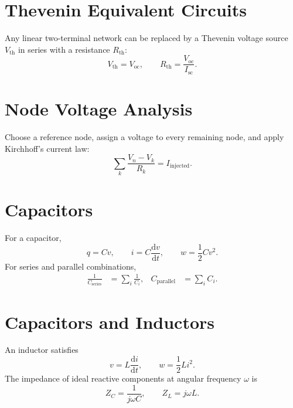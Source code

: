 \documentclass[12pt,a4paper]{article}
\begin{document}
\section{Thevenin Equivalent Circuits}

Any linear two-terminal network can be replaced by a Thevenin voltage
source $V_{\mathrm{th}}$ in series with a resistance $R_{\mathrm{th}}$:
\begin{equation}
	V_{\mathrm{th}} = V_{\mathrm{oc}},\qquad
	R_{\mathrm{th}} = \frac{V_{\mathrm{oc}}}{I_{\mathrm{sc}}}.
\end{equation}

\section{Node Voltage Analysis}

Choose a reference node, assign a voltage to every remaining node, and
apply Kirchhoff's current law:
\begin{equation}
	\sum_k \frac{V_n - V_k}{R_k} = I_{\mathrm{injected}}.
\end{equation}

\section{Capacitors}

For a capacitor,
\begin{equation}
	q = Cv,\qquad i = C\frac{\mathrm{d}v}{\mathrm{d}t},\qquad
	w = \frac{1}{2}Cv^2.
\end{equation}
For series and parallel combinations,
\begin{align}
	\frac{1}{C_{\mathrm{series}}} &= \sum_i \frac{1}{C_i}, &
	C_{\mathrm{parallel}} &= \sum_i C_i.
\end{align}

\section{Capacitors and Inductors}

An inductor satisfies
\begin{equation}
	v = L\frac{\mathrm{d}i}{\mathrm{d}t},\qquad
	w = \frac{1}{2}Li^2.
\end{equation}
The impedance of ideal reactive components at angular frequency $\omega$ is
\begin{equation}
	Z_C = \frac{1}{j\omega C},\qquad Z_L = j\omega L.
\end{equation}
\end{document}

